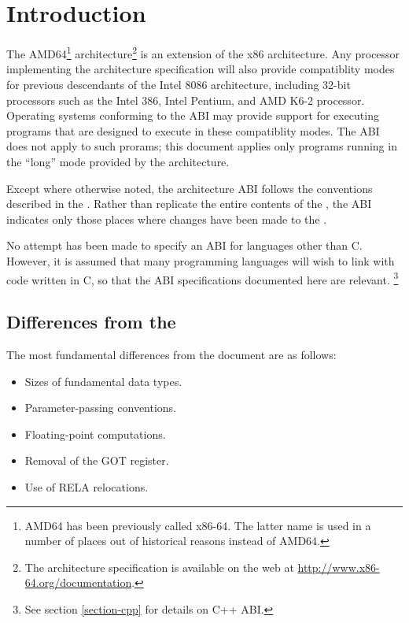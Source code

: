 \chapter{Introduction}

The AMD64\footnote{AMD64 has been previously called x86-64.  The
  latter name is used in a number of places out of historical reasons
  instead of AMD64.}  architecture\footnote{The architecture
  specification is available on the web at
  \url{http://www.x86-64.org/documentation}.} is an extension of the
x86 architecture.  Any processor implementing the \xARCH architecture
specification will also provide compatiblity modes for previous
descendants of the Intel 8086 architecture, including 32-bit
processors such as the Intel 386, Intel Pentium, and AMD K6-2
processor.  Operating systems conforming to the \xARCH ABI may provide
support for executing programs that are designed to execute in these
compatiblity modes.  The \xARCH ABI does not apply to such prorams;
this document applies only programs running in the ``long'' mode
provided by the \xARCH architecture.

Except where otherwise noted, the \xARCH architecture ABI follows the
conventions described in the \intelabi.  Rather than replicate the
entire contents of the \intelabi, the \xARCH ABI indicates only those
places where changes have been made to the \intelabi.

No attempt has been made to specify an ABI for languages other than C.
However, it is assumed that many programming languages will wish to
link with code written in C, so
that the ABI specifications documented here are relevant.%
\footnote{See section \ref{section-cpp} for details on C++ ABI.}

\section{Differences from the \intelabi}

The most fundamental differences from the \intelabi document
are as follows:
\begin{itemize}
\item Sizes of fundamental data types.
\item Parameter-passing conventions.
\item Floating-point computations.
\item Removal of the GOT register.
\item Use of RELA relocations.
\end{itemize}

